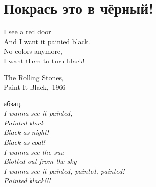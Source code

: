 \chapter{Покрась это в чёрный!} 
\vepsianrose

\setlength{\epigraphwidth}{0.45\textwidth}

\epigraph{%
	I see a red door \\
	And I want it painted black. \\
	No colors anymore, \\
	I want them to turn black! }
	{
	\begin{flushright}
		\small{The Rolling Stones,\\Paint It Black,~1966}
	\end{flushright}
	}


абзац.\\

\textit{
\hspace*{35mm} I wanna see it painted,\\
\hspace*{35mm} Painted black\\
\hspace*{35mm} Black as night!\\
\hspace*{35mm} Black as coal!\\
\hspace*{35mm} I wanna see the sun\\
\hspace*{35mm} Blotted out from the sky\\
\hspace*{35mm} I wanna see it painted, painted, painted!\\
\hspace*{35mm} Painted black!!!
}
\begin{center}
\end{center}
